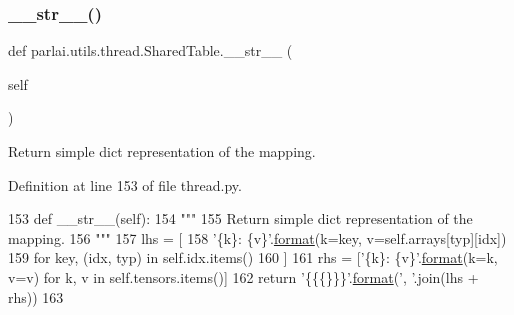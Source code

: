 \mbox{\label{classparlai_1_1utils_1_1thread_1_1SharedTable_aa18f723bbdfce0ab50d9c36b20cec2c7}} 
\subsubsection{\texorpdfstring{\+\_\+\+\_\+str\+\_\+\+\_\+()}{\_\_str\_\_()}}
{\footnotesize\ttfamily def parlai.\+utils.\+thread.\+Shared\+Table.\+\_\+\+\_\+str\+\_\+\+\_\+ (\begin{DoxyParamCaption}\item[{}]{self }\end{DoxyParamCaption})}

\begin{DoxyVerb}Return simple dict representation of the mapping.
\end{DoxyVerb}
 

Definition at line 153 of file thread.\+py.


\begin{DoxyCode}
153     \textcolor{keyword}{def }\_\_str\_\_(self):
154         \textcolor{stringliteral}{"""}
155 \textcolor{stringliteral}{        Return simple dict representation of the mapping.}
156 \textcolor{stringliteral}{        """}
157         lhs = [
158             \textcolor{stringliteral}{'\{k\}: \{v\}'}.\hyperlink{namespaceparlai_1_1chat__service_1_1services_1_1messenger_1_1shared__utils_a32e2e2022b824fbaf80c747160b52a76}{format}(k=key, v=self.arrays[typ][idx])
159             \textcolor{keywordflow}{for} key, (idx, typ) \textcolor{keywordflow}{in} self.idx.items()
160         ]
161         rhs = [\textcolor{stringliteral}{'\{k\}: \{v\}'}.\hyperlink{namespaceparlai_1_1chat__service_1_1services_1_1messenger_1_1shared__utils_a32e2e2022b824fbaf80c747160b52a76}{format}(k=k, v=v) \textcolor{keywordflow}{for} k, v \textcolor{keywordflow}{in} self.tensors.items()]
162         \textcolor{keywordflow}{return} \textcolor{stringliteral}{'\{\{\{\}\}\}'}.\hyperlink{namespaceparlai_1_1chat__service_1_1services_1_1messenger_1_1shared__utils_a32e2e2022b824fbaf80c747160b52a76}{format}(\textcolor{stringliteral}{', '}.join(lhs + rhs))
163 
\end{DoxyCode}
\mbox{\label{classparlai_1_1utils_1_1thread_1_1SharedTable_ab9acef58b28d0c992c841a4cc11a5df2}} 
